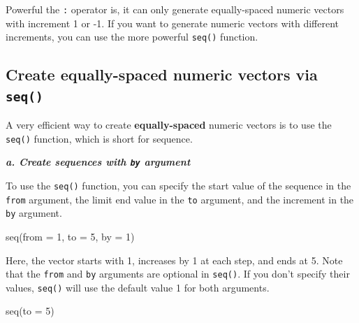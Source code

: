 \documentclass[
]{book}
\newenvironment{Shaded}{\begin{snugshade}}{\end{snugshade}}
\newcommand{\AttributeTok}[1]{\textcolor[rgb]{0.77,0.63,0.00}{#1}}
\newcommand{\DecValTok}[1]{\textcolor[rgb]{0.00,0.00,0.81}{#1}}
\newcommand{\FunctionTok}[1]{\textcolor[rgb]{0.00,0.00,0.00}{#1}}
\newcommand{\NormalTok}[1]{#1}
\begin{document}
Powerful the \texttt{:} operator is, it can only generate equally-spaced numeric vectors with increment 1 or -1. If you want to generate numeric vectors with different increments, you can use the more powerful \texttt{seq()} function.

\hypertarget{create-equally-spaced-numeric-vectors-via-seq}{%
\subsection{\texorpdfstring{Create equally-spaced numeric vectors via \texttt{seq()}}{Create equally-spaced numeric vectors via seq()}}\label{create-equally-spaced-numeric-vectors-via-seq}}

A very efficient way to create \textbf{equally-spaced} numeric vectors is to use the \texttt{seq()} function, which is short for sequence.

\textbf{\emph{a. Create sequences with \texttt{by} argument}}

To use the \texttt{seq()} function, you can specify the start value of the sequence in the \texttt{from} argument, the limit end value in the \texttt{to} argument, and the increment in the \texttt{by} argument.

\begin{Shaded}
\begin{Highlighting}[]
\FunctionTok{seq}\NormalTok{(}\AttributeTok{from =} \DecValTok{1}\NormalTok{, }\AttributeTok{to =} \DecValTok{5}\NormalTok{, }\AttributeTok{by =} \DecValTok{1}\NormalTok{)}
\end{Highlighting}
\end{Shaded}

Here, the vector starts with 1, increases by 1 at each step, and ends at 5. Note that the \texttt{from} and \texttt{by} arguments are optional in \texttt{seq()}. If you don't specify their values, \texttt{seq()} will use the default value 1 for both arguments.

\begin{Shaded}
\begin{Highlighting}[]
\FunctionTok{seq}\NormalTok{(}\AttributeTok{to =} \DecValTok{5}\NormalTok{)}
\end{Highlighting}
\end{Shaded}
\end{document}
